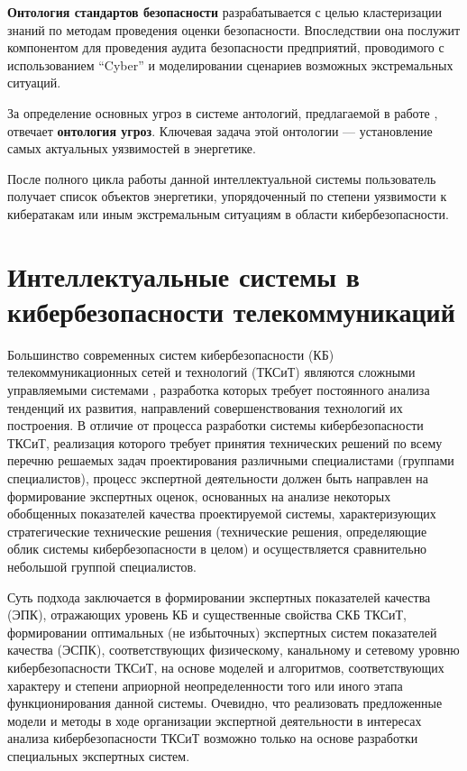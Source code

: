 \textbf{Онтология стандартов безопасности} разрабатывается с целью кластеризации знаний по методам проведения оценки
безопасности. Впоследствии она послужит компонентом для проведения
аудита безопасности предприятий, проводимого с использованием ``Cyber'' и моделировании сценариев возможных
экстремальных ситуаций.

За определение основных угроз в системе антологий, предлагаемой в работе \cite{ontoling}, отвечает \textbf{
онтология угроз}. Ключевая задача этой онтологии --- установление самых актуальных уязвимостей в энергетике.

После полного цикла работы данной интеллектуальной системы пользователь получает список объектов энергетики,
упорядоченный по степени уязвимости к кибератакам или иным экстремальным ситуациям в области кибербезопасности.

\newpage
\section{Интеллектуальные системы в кибербезопасности телекоммуникаций}
Большинство современных систем кибербезопасности (КБ) телекоммуникационных сетей и технологий (ТКСиТ)
являются сложными управляемыми системами \cite{tels},
разработка которых требует постоянного анализа тенденций их развития, направлений совершенствования
технологий их построения. В отличие от
процесса разработки системы кибербезопасности ТКСиТ, реализация которого требует принятия технических решений по всему перечню
решаемых задач проектирования различными специалистами (группами специалистов), процесс экспертной
деятельности должен быть направлен на формирование экспертных оценок, основанных на анализе некоторых
обобщенных показателей качества проектируемой системы, характеризующих стратегические технические
решения (технические решения, определяющие облик системы кибербезопасности в целом) и осуществляется
сравнительно небольшой группой специалистов.

Суть подхода заключается в формировании экспертных показателей качества (ЭПК), отражающих уровень
КБ и существенные свойства СКБ ТКСиТ, формировании оптимальных (не избыточных) экспертных систем
показателей качества (ЭСПК), соответствующих физическому, канальному и сетевому уровню
кибербезопасности ТКСиТ, на основе моделей и алгоритмов, соответствующих характеру и степени априорной
неопределенности того или иного этапа функционирования данной системы. Очевидно, что реализовать
предложенные модели и методы в ходе организации экспертной деятельности в интересах анализа
кибербезопасности ТКСиТ возможно только на основе разработки специальных экспертных систем.

